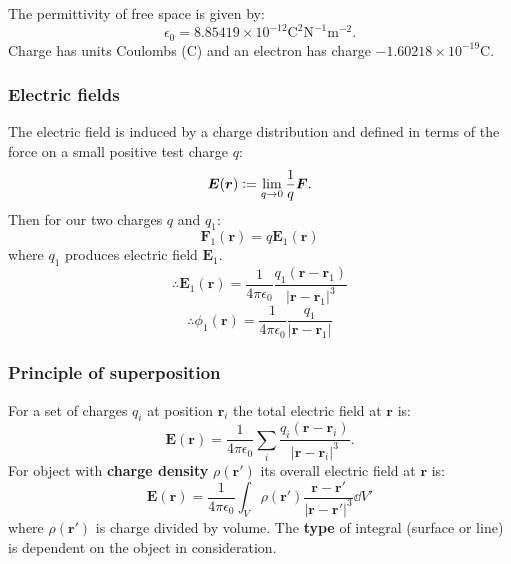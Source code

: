 \documentclass{article}
\newcommand{\deq}{\vcentcolon=}
\newcommand{\vc}[1]{\boldsymbol{#1}}
\begin{document}
\begin{multicols*}{3}
The permittivity of free space is given by:
$$\epsilon_0=8.85419\times10^{-12}
\text{C}^2\text{N}^{-1}\text{m}^{-2}.$$
Charge has units Coulombs (C) and an electron
has charge $-1.60218\times 10^{-19}$C.

\subsubsection*{Electric fields}
The electric field is induced by a charge distribution
and defined in terms of the
force on a small positive test charge $q$:
$$\vc{E}(\vc{r})\deq\lim_{q\rightarrow0}
\frac{1}{q}\vc{F}.$$
Then for our two charges $q$ and $q_1$:
$$\vc{F}_1(\vc{r})=q\vc{E}_1(\vc{r})$$
where $q_1$ produces electric field $\vc{E}_1$.
$$\therefore\vc{E}_1(\vc{r})
=\frac{1}{4\pi\epsilon_0}
\frac{q_1(\vc{r}-\vc{r}_1)}{|\vc{r}-\vc{r}_1|^3}$$
$$\therefore\phi_1(\vc{r})
=\frac{1}{4\pi\epsilon_0}
\frac{q_1}{|\vc{r}-\vc{r}_1|}$$

\subsubsection*{Principle of superposition}
For a set of charges $q_i$ at position $\vc{r}_i$
the total electric field at $\vc{r}$ is:
$$\vc{E}(\vc{r})=\frac{1}{4\pi\epsilon_0}
\sum_i\frac{q_i(\vc{r}-\vc{r}_i)}{|\vc{r}-\vc{r}_i|^3}.$$
For object with \textbf{charge density}
$\rho(\vc{r}')$ its overall electric field at $\vc{r}$ is:
$$\vc{E}(\vc{r})=\frac{1}{4\pi\epsilon_0}
\int_V\rho(\vc{r}')
\frac{\vc{r}-\vc{r}'}{|\vc{r}-\vc{r}'|^3}\dd V'$$
where $\rho(\vc{r}')$ is charge divided by volume.
The \textbf{type} of integral (surface or line) is
dependent on the object in consideration.


\end{multicols*}
\end{document}
